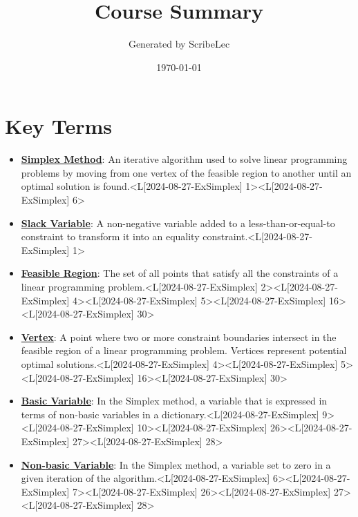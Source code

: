 \documentclass{article}%
\title{Course Summary}%
\author{Generated by ScribeLec}%
\date{\today}%
\begin{document}
%
\normalsize%
\maketitle%
\tableofcontents\newpage%
\section{Key Terms}%
\label{sec:KeyTerms}%
\begin{itemize}[[leftmargin=*]]%
\item \href{https://www.math.purdue.edu/~yipn/421/2024-08-27-ExSimplex.pdf#page=1}{\textbf{Simplex Method}}: An iterative algorithm used to solve linear programming problems by moving from one vertex of the feasible region to another until an optimal solution is found.<L[2024-08-27-ExSimplex] 1><L[2024-08-27-ExSimplex] 6>%
\item \href{https://www.math.purdue.edu/~yipn/421/2024-08-27-ExSimplex.pdf#page=1}{\textbf{Slack Variable}}: A non-negative variable added to a less-than-or-equal-to constraint to transform it into an equality constraint.<L[2024-08-27-ExSimplex] 1>%
\item \href{https://www.math.purdue.edu/~yipn/421/2024-08-27-ExSimplex.pdf#page=2}{\textbf{Feasible Region}}: The set of all points that satisfy all the constraints of a linear programming problem.<L[2024-08-27-ExSimplex] 2><L[2024-08-27-ExSimplex] 4><L[2024-08-27-ExSimplex] 5><L[2024-08-27-ExSimplex] 16><L[2024-08-27-ExSimplex] 30>%
\item \href{https://www.math.purdue.edu/~yipn/421/2024-08-27-ExSimplex.pdf#page=4}{\textbf{Vertex}}: A point where two or more constraint boundaries intersect in the feasible region of a linear programming problem. Vertices represent potential optimal solutions.<L[2024-08-27-ExSimplex] 4><L[2024-08-27-ExSimplex] 5><L[2024-08-27-ExSimplex] 16><L[2024-08-27-ExSimplex] 30>%
\item \href{https://www.math.purdue.edu/~yipn/421/2024-08-27-ExSimplex.pdf#page=9}{\textbf{Basic Variable}}: In the Simplex method, a variable that is expressed in terms of non-basic variables in a dictionary.<L[2024-08-27-ExSimplex] 9><L[2024-08-27-ExSimplex] 10><L[2024-08-27-ExSimplex] 26><L[2024-08-27-ExSimplex] 27><L[2024-08-27-ExSimplex] 28>%
\item \href{https://www.math.purdue.edu/~yipn/421/2024-08-27-ExSimplex.pdf#page=6}{\textbf{Non{-}basic Variable}}: In the Simplex method, a variable set to zero in a given iteration of the algorithm.<L[2024-08-27-ExSimplex] 6><L[2024-08-27-ExSimplex] 7><L[2024-08-27-ExSimplex] 26><L[2024-08-27-ExSimplex] 27><L[2024-08-27-ExSimplex] 28>%

\end{itemize}
\end{document}
